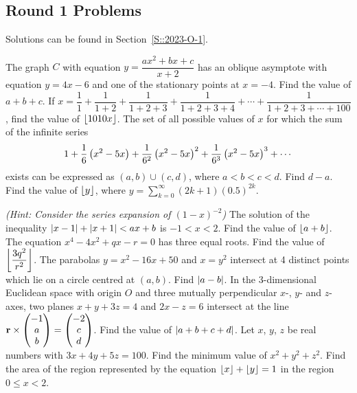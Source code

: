 \subsection{Round 1 Problems}
Solutions can be found in Section~\ref{S::2023-O-1}.

\begin{enumerate}
    \hyperrefitem[Q::2023-O-1-1] The graph $C$ with equation $y = \dfrac{ax^2 + bx + c}{x+2}$ has an oblique asymptote with equation $y = 4x - 6$ and one of the stationary points at $x = -4$. Find the value of $a + b + c$.
    \hyperrefitem[Q::2023-O-1-2] If $x = \dfrac{1}{1} + \dfrac{1}{1+2} + \dfrac{1}{1+2+3} + \dfrac{1}{1+2+3+4} + \cdots + \dfrac{1}{1 + 2 + 3 + \cdots + 100}$, find the value of $\left\lfloor 1010x \right\rfloor$.
    \hyperrefitem[Q::2023-O-1-3] The set of all possible values of $x$ for which the sum of the infinite series \[1 + \dfrac16 \left( x^2 - 5x \right) + \dfrac1{6^2} \left( x^2 - 5x \right)^2 + \dfrac1{6^3} \left( x^2 - 5x \right)^3 + \cdots\] exists can be expressed as $(a, b) \cup (c, d)$, where $a < b < c < d$. Find $d - a$.
    \hyperrefitem[Q::2023-O-1-4] Find the value of $\left\lfloor y \right\rfloor$, where $y = \displaystyle\sum_{k=0}^\infty (2k+1)(0.5)^{2k}$.

    \textit{(Hint: Consider the series expansion of $(1 - x)^{-2}$)}
    \hyperrefitem[Q::2023-O-1-5] The solution of the inequality $\left\lvert x-1 \right\rvert + \left\lvert x+1 \right\rvert < ax + b$ is $-1 < x < 2$. Find the value of $\left\lfloor a + b \right\rfloor$.
    \hyperrefitem[Q::2023-O-1-6] The equation $x^4 - 4x^2 + qx - r = 0$ has three equal roots. Find the value of $\left\lfloor \dfrac{3q^2}{r^2} \right\rfloor$.
    \hyperrefitem[Q::2023-O-1-7] The parabolas $y = x^2 - 16x + 50$ and $x = y^2$ intersect at 4 distinct points which lie on a circle centred at $(a, b)$. Find $\left\lvert a - b \right\rvert$.
    \hyperrefitem[Q::2023-O-1-8] In the 3-dimensional Euclidean space with origin $O$ and three mutually perpendicular $x$-, $y$- and $z$-axes, two planes $x + y + 3z = 4$ and $2x - z = 6$ intersect at the line $\mathbf{r} \times \begin{pmatrix} -1 \\ a \\ b \end{pmatrix} = \begin{pmatrix} -2 \\ c \\ d \end{pmatrix}$. Find the value of $\left\lvert a + b + c + d \right\rvert$.
    \hyperrefitem[Q::2023-O-1-9] Let $x$, $y$, $z$ be real numbers with $3x + 4y + 5z = 100$. Find the minimum value of $x^2 + y^2 + z^2$.
    \hyperrefitem[Q::2023-O-1-10] Find the area of the region represented by the equation $\left\lfloor x \right\rfloor + \left\lfloor y \right\rfloor = 1$ in the region $0 \leq x < 2$.


\end{enumerate}
